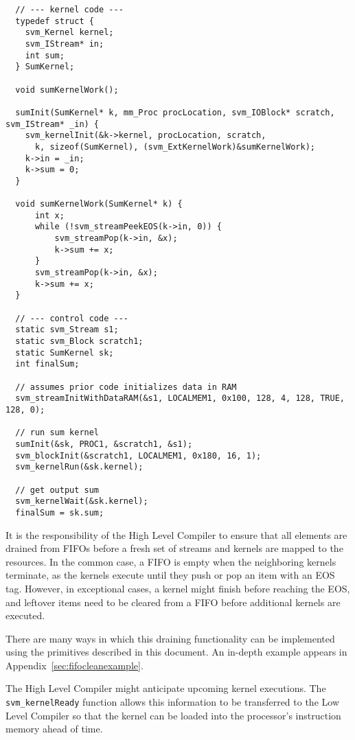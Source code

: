 {\small
\begin{verbatim}
  // --- kernel code ---
  typedef struct {
    svm_Kernel kernel;
    svm_IStream* in;
    int sum;
  } SumKernel;

  void sumKernelWork();
  
  sumInit(SumKernel* k, mm_Proc procLocation, svm_IOBlock* scratch, svm_IStream* _in) {
    svm_kernelInit(&k->kernel, procLocation, scratch,
      k, sizeof(SumKernel), (svm_ExtKernelWork)&sumKernelWork); 
    k->in = _in;
    k->sum = 0;
  }

  void sumKernelWork(SumKernel* k) {
      int x;
      while (!svm_streamPeekEOS(k->in, 0)) {
          svm_streamPop(k->in, &x);
          k->sum += x;
      }
      svm_streamPop(k->in, &x);
      k->sum += x;
  }

  // --- control code ---
  static svm_Stream s1;
  static svm_Block scratch1;
  static SumKernel sk;
  int finalSum;

  // assumes prior code initializes data in RAM
  svm_streamInitWithDataRAM(&s1, LOCALMEM1, 0x100, 128, 4, 128, TRUE, 128, 0);

  // run sum kernel
  sumInit(&sk, PROC1, &scratch1, &s1);
  svm_blockInit(&scratch1, LOCALMEM1, 0x180, 16, 1);
  svm_kernelRun(&sk.kernel);

  // get output sum
  svm_kernelWait(&sk.kernel);
  finalSum = sk.sum; 
\end{verbatim}}

\label{sec:fifoclean}

It is the responsibility of the High Level Compiler to ensure that all
elements are drained from FIFOs before a fresh set of streams and
kernels are mapped to the resources.  In the common case, a FIFO is
empty when the neighboring kernels terminate, as the kernels execute
until they push or pop an item with an EOS tag.  However, in
exceptional cases, a kernel might finish before reaching the EOS, and
leftover items need to be cleared from a FIFO before additional
kernels are executed.

There are many ways in which this draining functionality can be
implemented using the primitives described in this document.  An
in-depth example appears in Appendix~\ref{sec:fifocleanexample}.


The High Level Compiler might anticipate upcoming kernel
executions. The {\tt svm\_kernelReady} function allows this
information to be transferred to the Low Level Compiler so that the
kernel can be loaded into the processor's instruction memory ahead of
time.

